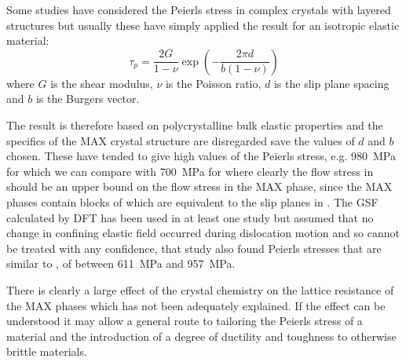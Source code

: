Some studies have considered the Peierls stress in complex crystals with layered structures \cite{Music2008,Emmerlich2009,Gouriet2015} but usually these have simply applied the result for an isotropic elastic material:
\begin{equation}
\tau_p = \frac{2G}{1-\nu} \exp \left( - \frac{2 \pi d}{b(1-\nu)} \right)
\end{equation}
where $G$ is the shear modulus, $\nu$ is the Poisson ratio, $d$ is the slip plane spacing and $b$ is the Burgers vector.


The result is therefore based on polycrystalline bulk elastic properties and the specifics of the MAX crystal structure are disregarded save the values of $d$ and $b$ chosen. These have tended to give high values of the Peierls stress, e.g. \SI{980}{\mega\pascal} for  \cite{Music2008} which we can compare with \SI{700}{\mega\pascal} for  \cite{Clegg2006} where clearly the flow stress in  should be an upper bound on the flow stress in the MAX phase, since the MAX phases contain blocks of  which are equivalent to the slip planes in  \cite{Hollox1966}. The GSF calculated by DFT has been used in at least one study \cite{Gouriet2015} but assumed that no change in confining elastic field occurred during dislocation motion and so cannot be treated with any confidence, that study also found Peierls stresses that are similar to , of between \SI{611}{\mega\pascal} and \SI{957}{\mega\pascal}.

There is clearly a large effect of the crystal chemistry on the lattice resistance of the MAX phases which has not been adequately explained. If the effect can be understood it may allow a general route to tailoring the Peierls stress of a material and the introduction of a degree of ductility and toughness to otherwise brittle materials.
























































